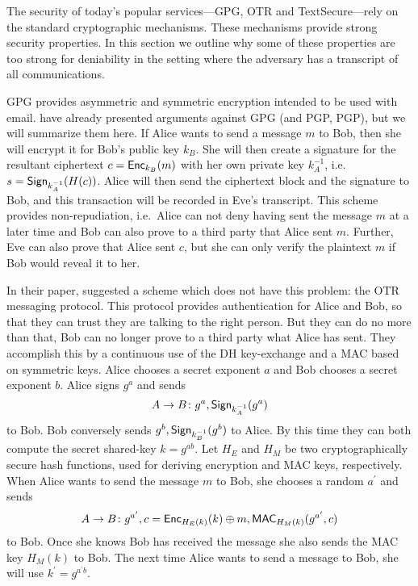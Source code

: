 The security of today's popular services---\ac{GPG}, \ac{OTR} and 
TextSecure---rely on the standard cryptographic mechanisms.
These mechanisms provide strong security properties.
In this section we outline why some of these properties are too strong for 
deniability in the setting where the adversary has a transcript of all 
communications.

\ac{GPG} provides asymmetric and symmetric encryption intended to be used with 
email.
\citet{otr2004} have already presented arguments against \ac{GPG} (and 
\acl{PGP}, \acs{PGP}), but we will summarize them here.
If Alice wants to send a message \(m\) to Bob, then she will encrypt it for 
Bob's public key \(k_B\).
She will then create a signature for the resultant ciphertext \(c = \operatorname{\mathsf{Enc}}_{k_B}( 
m )\) with her own private key \(k_A^{-1}\), i.e.~\(s = \operatorname{\mathsf{Sign}}_{k_A^{-1}}( H(c) 
)\).
Alice will then send the ciphertext block and the signature to Bob, and this 
transaction will be recorded in Eve's transcript.
This scheme provides non-repudiation, i.e.~Alice can not deny having sent the 
message \(m\) at a later time and Bob can also prove to a third party that 
Alice sent \(m\).
Further, Eve can also prove that Alice sent \(c\), but she can only verify the 
plaintext \(m\) if Bob would reveal it to her.

In their paper, \citet{otr2004} suggested a scheme which does not have this 
problem: the \ac{OTR} messaging protocol.
This protocol provides authentication for Alice and Bob, so that they can trust 
they are talking to the right person.
But they can do no more than that, Bob can no longer prove to a third party 
what Alice has sent.
They accomplish this by a continuous use of the \ac{DH} key-exchange and 
a \ac{MAC} based on symmetric keys.
Alice chooses a secret exponent \(a\) and Bob chooses a secret exponent \(b\).
Alice signs \(g^a\) and sends \[
  A\to B\colon g^a, \operatorname{\mathsf{Sign}}_{k_A^{-1}}( g^a )
\] to Bob.
Bob conversely sends \(g^b, \operatorname{\mathsf{Sign}}_{k_B^{-1}}( g^b )\) to Alice.
By this time they can both compute the secret shared-key \(k = g^{ab}\).
Let \(H_E\) and \(H_M\) be two cryptographically secure hash functions, used 
for deriving encryption and \ac{MAC} keys, respectively.
When Alice wants to send the message \(m\) to Bob, she chooses a random 
\(a^\prime\) and sends \[
  A\to B\colon g^{a^\prime}, c = \operatorname{\mathsf{Enc}}_{H_E( k )}( k )\oplus m,
  \operatorname{\mathsf{MAC}}_{H_M( k )}( g^{a^\prime}, c )
\] to Bob.
Once she knows Bob has received the message she also sends the \ac{MAC} key 
\(H_M( k )\) to Bob.
The next time Alice wants to send a message to Bob, she will use \(k^\prime 
= g^{a^\prime b}\).

